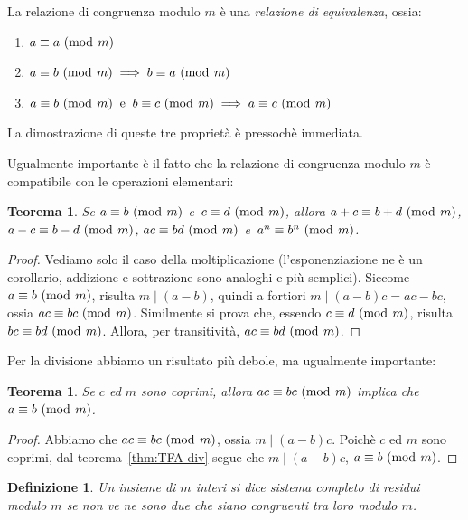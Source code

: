 \documentclass[pdflatex,11pt,a4paper,oneside]{article}
\let\OldEmph\emph
\renewcommand{\emph}[1]{\OldEmph{#1\/}}
\newcommand{\acro}[1]{\text{{\frenchspacing {#1} }}}
\newcommand{\ie}[0]{\acro{i.e.}}
\newcommand{\p}[1]{\left({#1}\right)}
\newcommand{\divides}[0]{\mid}
\newcommand{\congruent}[0]{\equiv}
\newcommand{\mmodop}[0]{\ensuremath{\operatorname{mod}}}
\newcommand{\mmod}[1]{\ensuremath{\allowbreak\ (\mmodop\:{#1})}}
\newtheorem{theorem}[TheoremLike]{Teorema}
\newtheorem{definition}[TheoremLike]{Definizione}
\begin{document}
La relazione di congruenza modulo $m$ \`e una \emph{relazione di
equivalenza}, ossia:
\begin{enumerate}
\item $a \congruent a \mmod m$
\item $a \congruent b \mmod m \implies b \congruent a \mmod m$
\item $a \congruent b \mmod m ~\:\textrm{e}\:~
       b \congruent c \mmod m \implies
       a \congruent c \mmod m$
\end{enumerate}
La dimostrazione di queste tre propriet\`a \`e pressoch\`e immediata.

\smallskip
Ugualmente importante \`e il fatto che la relazione di congruenza
modulo $m$ \`e compatibile con le operazioni elementari:
%
\begin{theorem}\label{thm:modular-operation}
Se $a \congruent b \mmod m$ e\, $c \congruent d \mmod m$, allora
$a + c \congruent b + d \mmod m$, $a - c \congruent b - d \mmod m$,
$ac \congruent bd \mmod m$ e\, $a^n \congruent b^n \mmod m$.

\end{theorem}
%
\begin{proof}
Vediamo solo il caso della moltiplicazione (l'esponenziazione ne \`e
un corollario, addizione e sottrazione sono analoghi e pi\`u semplici).
Siccome $a \congruent b \mmod m$, risulta $m \divides \p{a - b}$,
quindi a fortiori $m \divides \p{a - b}c = ac - bc$, ossia
$ac \congruent bc \mmod m$.  Similmente si prova che, essendo
$c \congruent d \mmod m$, risulta $bc \congruent bd \mmod m$.
Allora, per transitivit\`a, $ac \congruent bd \mmod m$.
\end{proof}

Per la divisione abbiamo un risultato pi\`u debole, ma ugualmente
importante:
%
\begin{theorem}\label{thm:simplify-modulo-m}
Se $c$ ed $m$ sono coprimi, allora $ac \congruent bc \mmod m$ implica
che $a \congruent b \mmod m$.
\end{theorem}
%
\begin{proof}
Abbiamo che $ac \congruent bc \mmod m$, ossia $m \divides \p{a -b}c$.
Poich\`e $c$ ed $m$ sono coprimi, dal teorema~\eqref{thm:TFA-div}
segue che $m \divides \p{a -b}c$, \ie $a \congruent b \mmod m$.
\end{proof}

\begin{definition}
Un insieme di $m$ interi si dice \emph{sistema completo di residui modulo
$m$} se non ve ne sono due che siano congruenti tra loro modulo $m$.
\end{definition}
\end{document}
